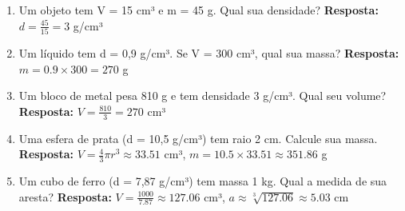 \documentclass[11pt]{article}
\begin{document}
\begin{multicols}{2}
\begin{enumerate}[label=\alph*)]
    \item  Um objeto tem V = 15 cm³ e m = 45 g. Qual sua densidade?
    \textbf{Resposta:} $d = \frac{45}{15} = 3$ g/cm³
    
    \item  Um líquido tem d = 0,9 g/cm³. Se V = 300 cm³, qual sua massa?
    \textbf{Resposta:} $m = 0.9 \times 300 = 270$ g
    
    \item  Um bloco de metal pesa 810 g e tem densidade 3 g/cm³. Qual seu volume?
    \textbf{Resposta:} $V = \frac{810}{3} = 270$ cm³
    
    \item  Uma esfera de prata (d = 10,5 g/cm³) tem raio 2 cm. Calcule sua massa.
    \textbf{Resposta:} $V = \frac{4}{3}\pi r^3 \approx 33.51$ cm³, $m = 10.5 \times 33.51 \approx 351.86$ g
    
    \item  Um cubo de ferro (d = 7,87 g/cm³) tem massa 1 kg. Qual a medida de sua aresta?
    \textbf{Resposta:} $V = \frac{1000}{7.87} \approx 127.06$ cm³, $a \approx \sqrt[3]{127.06} \approx 5.03$ cm
\end{enumerate}
\end{multicols}
\end{document}
